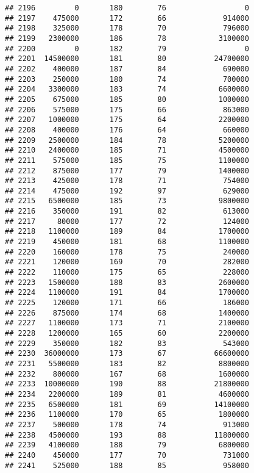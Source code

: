 \documentclass[
]{article}
\begin{document}
\begin{verbatim}
## 2196         0       180        76                  0
## 2197    475000       172        66             914000
## 2198    325000       178        70             796000
## 2199   2300000       186        78            3100000
## 2200         0       182        79                  0
## 2201  14500000       181        80           24700000
## 2202    400000       187        84             690000
## 2203    250000       180        74             700000
## 2204   3300000       183        74            6600000
## 2205    675000       185        80            1000000
## 2206    575000       175        66             863000
## 2207   1000000       175        64            2200000
## 2208    400000       176        64             660000
## 2209   2500000       184        78            5200000
## 2210   2400000       185        71            4500000
## 2211    575000       185        75            1100000
## 2212    875000       177        79            1400000
## 2213    425000       178        71             754000
## 2214    475000       192        97             629000
## 2215   6500000       185        73            9800000
## 2216    350000       191        82             613000
## 2217     80000       177        72             124000
## 2218   1100000       189        84            1700000
## 2219    450000       181        68            1100000
## 2220    160000       178        75             240000
## 2221    120000       169        70             282000
## 2222    110000       175        65             228000
## 2223   1500000       188        83            2600000
## 2224   1100000       191        84            1700000
## 2225    120000       171        66             186000
## 2226    875000       174        68            1400000
## 2227   1100000       173        71            2100000
## 2228   1200000       165        60            2200000
## 2229    350000       182        83             543000
## 2230  36000000       173        67           66600000
## 2231   5500000       183        82            8800000
## 2232    800000       167        68            1600000
## 2233  10000000       190        88           21800000
## 2234   2200000       189        81            4600000
## 2235   6500000       181        69           14100000
## 2236   1100000       170        65            1800000
## 2237    500000       178        74             913000
## 2238   4500000       193        88           11800000
## 2239   4100000       188        79            6800000
## 2240    450000       177        70             731000
## 2241    525000       188        85             958000

\end{verbatim}
\end{document}
